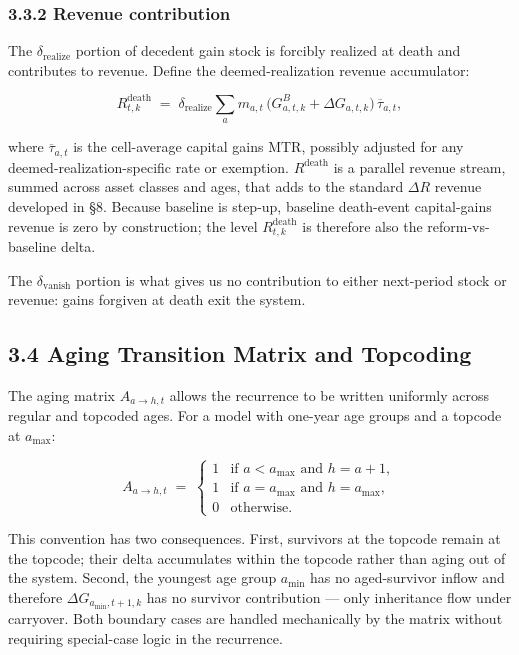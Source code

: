 \documentclass[11pt]{article}
\begin{document}
\subsubsection*{3.3.2 Revenue contribution}

The $\delta_{\text{realize}}$ portion of decedent gain stock is forcibly realized at death and contributes to revenue. Define the deemed-realization revenue accumulator:

\[
\boxed{
R^{\text{death}}_{t, k}
\;=\;
\delta_{\text{realize}}
\sum_a m_{a,t}\,\big(G^B_{a,t,k} + \Delta G_{a,t,k}\big)\,\overline{\tau}_{a,t},
}
\]

where $\overline{\tau}_{a,t}$ is the cell-average capital gains MTR, possibly adjusted for any deemed-realization-specific rate or exemption. $R^{\text{death}}$ is a parallel revenue stream, summed across asset classes and ages, that adds to the standard $\Delta R$ revenue developed in §8. Because baseline is step-up, baseline death-event capital-gains revenue is zero by construction; the level $R^{\text{death}}_{t,k}$ is therefore also the reform-vs-baseline delta.

The $\delta_{\text{vanish}}$ portion is what gives us no contribution to either next-period stock or revenue: gains forgiven at death exit the system.

\subsection*{3.4 Aging Transition Matrix and Topcoding}

The aging matrix $A_{a \to h, t}$ allows the recurrence to be written uniformly across regular and topcoded ages. For a model with one-year age groups and a topcode at $a_{\max}$:

\[
A_{a \to h, t} \;=\;
\begin{cases}
1 & \text{if } a < a_{\max} \text{ and } h = a + 1, \\
1 & \text{if } a = a_{\max} \text{ and } h = a_{\max}, \\
0 & \text{otherwise}.
\end{cases}
\]

This convention has two consequences. First, survivors at the topcode remain at the topcode; their delta accumulates within the topcode rather than aging out of the system. Second, the youngest age group $a_{\min}$ has no aged-survivor inflow and therefore $\Delta G_{a_{\min}, t+1, k}$ has no survivor contribution — only inheritance flow under carryover. Both boundary cases are handled mechanically by the matrix without requiring special-case logic in the recurrence.
\end{document}
